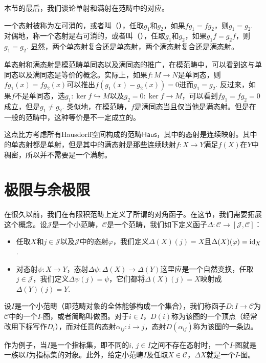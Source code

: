 本节的最后，我们谈论单射和满射在范畴中的对应。

\begin{para}
一个态射被称为左可消的，或者叫（），任取$g_1$和$g_2$，如果$fg_1=fg_2$，则$g_1=g_2$. 对偶地，称一个态射是右可消的，或者叫（），任取$g_1$和$g_2$，如果$g_1f=g_2f$，则$g_1=g_2$. 显然，两个单态射复合还是单态射，两个满态射复合还是满态射。
\end{para}

单态射和满态射是模范畴单同态以及满同态的推广，在模范畴中，可以看到这与单同态以及满同态是等价的概念。实际上，如果$f:M\to N$是单同态，则$fg_1(x)=fg_2(x)$可以推出$f(g_1(x)-g_2(x))=0$进而$g_1=g_2$. 反过来，如果$f$不是单同态，选$g_1:\ker f\hookrightarrow M$以及$g_2=0:\ker f\to M$，可以看到$fg_1=fg_2=0$成立，但是$g_1\neq g_2$. 类似地，在模范畴，$f$是满同态当且仅当他是满态射。但是在一般的范畴中，这种等价是不一定成立的。

这点比方考虑所有Hausdorff空间构成的范畴$\mathsf{Haus}$，其中的态射是连续映射。其中的单态射都是单射，但是其中的满态射是那些连续映射$f:X\to Y$满足$f(X)$在$Y$中稠密，所以并不需要是一个满射。

\section{极限与余极限}

\para 在很久以前，我们在有限积范畴上定义了所谓的对角函子。在这节，我们需要拓展这个概念。设$\mathcal{J}$是一个小范畴，$\mathcal{C}$是一个范畴，我们如下定义函子$\Delta:\mathcal{C}\to [\mathcal{J},\mathcal{C}]$：
\begin{itemize}
\item 任取$X$和$j\in \mathcal{J}$以及$\mathcal{J}$中的态射$\varphi$，我们定义$\Delta(X)(j)=X$且$\Delta(X)(\varphi)=\operatorname{id}_X$.
\item 对态射$\psi:X\to Y$，态射$\Delta\psi:\Delta(X)\to \Delta(Y)$这里应是一个自然变换，任取$j\in \mathcal{J}$，我们定义$\Delta\psi(j)=\psi$，它们都将$\Delta(X)(j)=X$映射成$\Delta(Y)(j)=Y$.
\end{itemize}

\para 设$I$是一个小范畴（即范畴对象的全体能够构成一个集合），我们称函子$D:I\to \mathcal{C}$为$\mathcal{C}$中的一个$I$-图，或者简略叫做图。对于$i\in I$，$D(i)$称为该图的一个顶点（经常改用下标写作$D_i$），而对任意的态射$\alpha_{ij}:i\to j$，态射$D(\alpha_{ij})$称为该图的一条边。

作为例子，当$I$是一个指标集，即不同的$i$, $j\in I$之间不存在态射时，一个$I$-图就是一族以$I$为指标集的对象。此外，给定小范畴$I$及任取$X\in \mathcal{C}$，$\Delta X$就是一个$I$-图。

